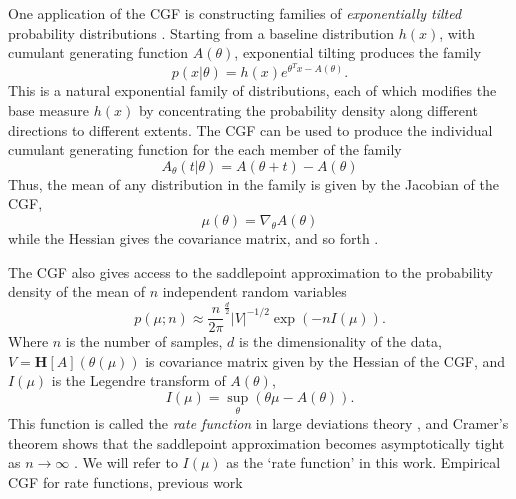 \documentclass[11pt]{article}      %
\begin{document}
One application of the CGF is constructing families of \textit{exponentially tilted} probability distributions \cite{morris_natural_1982,morris_unifying_2009}.
Starting from a baseline distribution $h(x)$, with cumulant generating function $A(\theta)$, exponential tilting produces the family
\begin{equation}
  p(x | \theta) = h(x) e^{\theta^T x - A(\theta)}. \label{def:exponential_tilt}
\end{equation}
This is a natural exponential family of distributions, each of which modifies the base measure $h(x)$ by concentrating the probability density along different directions to different extents.
The CGF can be used to produce the individual cumulant generating function for the each member of the family
\begin{equation}
  A_\theta(t | \theta) = A(\theta + t) - A(\theta) \label{eq:CGF_family}
\end{equation}
Thus, the mean of any distribution in the family is given by the Jacobian of the CGF,
\begin{equation}
  \mu(\theta) = \nabla_\theta A(\theta) \label{eq:cgf_jacobian}
\end{equation}
while the Hessian gives the covariance matrix, and so forth \cite{barndorff2014information}.

The CGF also gives access to the saddlepoint approximation \cite{daniels_saddlepoint_1954} to the probability density of the mean of $n$ independent random variables
\begin{equation}
  p(\mu; n) \approx \frac{n}{2\pi}^{\frac{d}{2}} |V|^{-1/2} \exp(-n I(\mu)). \label{def:mean_density}
\end{equation}
Where $n$ is the number of samples, $d$ is the dimensionality of the data, $V = {\bm H}[A](\theta(\mu))$ is covariance matrix given by the Hessian of the CGF, and $I(\mu)$ is the Legendre transform of $A(\theta)$,
\begin{equation}
  I(\mu) = \sup_{\theta}( \theta \mu - A(\theta) ). \label{eq:legendre_transform}
\end{equation}
This function is called the \textit{rate function} in large deviations theory \cite{dembo2009large}, and Cramer's theorem shows that the saddlepoint approximation becomes asymptotically tight as $n \to \infty$ \cite{iltis_sharp_1995,chaganty_multidimensional_1986}.
We will refer to $I(\mu)$ as the `rate function' in this work.
Empirical CGF for rate functions, previous work
\end{document}

